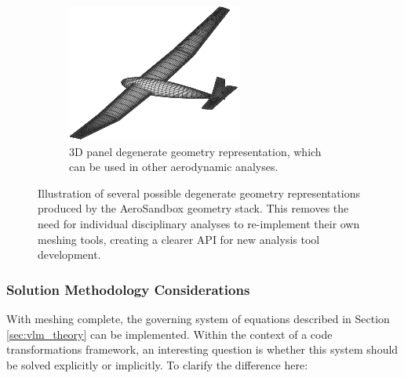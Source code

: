 \begin{figure}[h]
\begin{subfigure}{0.32\textwidth}
        \label{fig:geometry_mean_camber}
    \end{subfigure}
    \begin{subfigure}{0.32\textwidth}
        \includegraphics[width=\textwidth]{../figures/geometry_panel-crop.pdf}
        \caption{3D panel degenerate geometry representation, which can be used in other aerodynamic analyses.}
        \label{fig:geometry_panel}
    \end{subfigure}
    \caption{Illustration of several possible degenerate geometry representations produced by the AeroSandbox geometry stack. This removes the need for individual disciplinary analyses to re-implement their own meshing tools, creating a clearer API for new analysis tool development.}
    \label{fig:degen_geometry}
\end{figure}

\subsubsection{Solution Methodology Considerations}

With meshing complete, the governing system of equations described in Section \ref{sec:vlm_theory} can be implemented. Within the context of a code transformations framework, an interesting question is whether this system should be solved explicitly or implicitly. To clarify the difference here:

